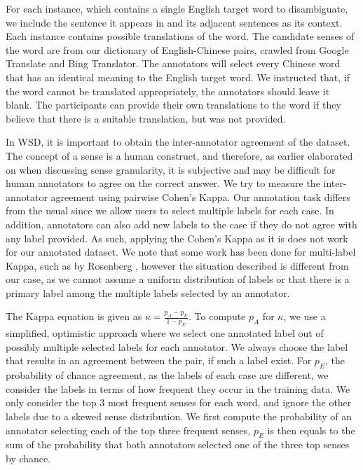 \documentclass[11pt]{article}
\begin{document}
For each instance, which contains a single English target word to disambiguate, we include the sentence it appears in and its adjacent sentences as its context. Each instance contains possible translations of the word. The candidate senses of the word are from our dictionary of English-Chinese pairs, crawled from Google Translate and Bing Translator. The annotators will select every Chinese word that has an identical meaning to the English target word. We instructed that, if the word cannot be translated appropriately, the annotators should leave it blank. The participants can provide their own translations to the word if they believe that there is a suitable translation, but was not provided. 


In WSD, it is important to obtain the inter-annotator agreement of the dataset. The concept of a sense is a human construct, and therefore, as earlier elaborated on when discussing sense granularity, it is subjective and may be difficult for human annotators to agree on the correct answer. We try to measure the inter-annotator agreement using pairwise Cohen's Kappa. Our annotation task differs from the usual since we allow users to select multiple labels for each case. In addition, annotators can also add new labels to the case if they do not agree with any label provided. As such, applying the Cohen's Kappa as it is does not work for our annotated dataset. We note that some work has been done for multi-label Kappa, such as by Rosenberg , however the situation described  is different from our case, as we cannot assume a uniform distribution of labels or that there is a primary label among the multiple labels selected by an annotator. 

The Kappa equation is given as 
$\kappa = \frac{p_A - p_E}{1 - p_E} $.
To compute $p_A$ for $\kappa$, we use a simplified, optimistic approach where we select one annotated label out of possibly multiple selected labels for each annotator. We always choose the label that results in an agreement between the pair, if such a label exist. For $p_E$, the probability of chance agreement, as the labels of each case are different, we consider the labels in terms of how frequent they occur in the training data. We only consider the top 3 most frequent senses for each word, and ignore the other labels due to a skewed sense distribution. We first compute the probability of an annotator selecting each of the top three frequent senses, $p_E$ is then equals to the sum of the probability that both annotators selected one of the three top senses by chance. 
\end{document}

